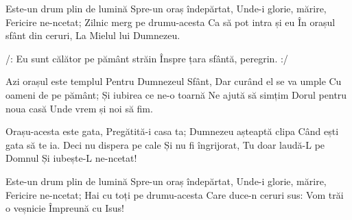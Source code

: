 \beginverse
Este-un drum plin de lumină
Spre-un oraș îndepărtat,
Unde-i glorie, mărire,
Fericire ne-ncetat;
Zilnic merg pe drumu-acesta
Ca să pot intra și eu
În orașul sfânt din ceruri,
La Mielul lui Dumnezeu.
\endverse

\beginchorus
/: Eu sunt călător pe pământ străin
Înspre țara sfântă, peregrin. :/
\endchorus

\beginverse
Azi orașul este templul
Pentru Dumnezeul Sfânt,
Dar curând el se va umple
Cu oameni de pe pământ;
Și iubirea ce ne-o toarnă
Ne ajută să simțim
Dorul pentru noua casă
Unde vrem și noi să fim.
\endverse

\beginverse
Orașu-acesta este gata,
Pregătită-i casa ta;
Dumnezeu așteaptă clipa
Când ești gata să te ia.
Deci nu dispera pe cale
Și nu fi îngrijorat,
Tu doar laudă-L pe Domnul
Și iubește-L ne-ncetat!
\endverse

\beginverse
Este-un drum plin de lumină
Spre-un oraș îndepărtat,
Unde-i glorie, mărire,
Fericire ne-ncetat;
Hai cu toți pe drumu-acesta
Care duce-n ceruri sus:
Vom trăi o veșnicie
Împreună cu Isus!
\endverse
\endsong